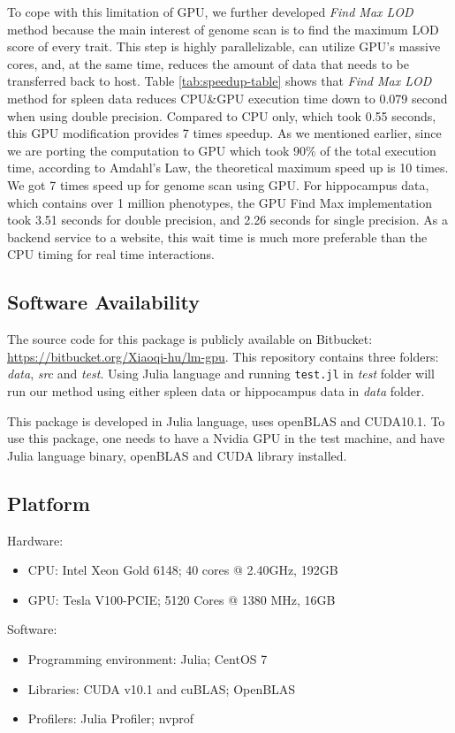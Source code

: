 \documentclass[9pt,twocolumn,twoside,lineno]{gsag3jnl}
\newcommand{\code}{\texttt}
\begin{document}
To cope with this limitation of GPU, we further developed \textit{Find Max LOD} method because the main interest of genome scan is to find the maximum LOD score of every trait. 
This step is highly parallelizable, can utilize GPU's massive cores, and, at the same time, reduces the amount of data that needs to be transferred back to host. 
Table \ref{tab:speedup-table} shows that \textit{Find Max LOD} method for spleen data reduces CPU\&GPU execution time down to 0.079 second when using double precision. 
Compared to CPU only, which took 0.55 seconds, this GPU modification provides 7 times speedup. 
As we mentioned earlier, since we are porting the computation to GPU which took 90\% of the total execution time, according to Amdahl's Law, the theoretical maximum speed up is 10 times. 
We got 7 times speed up for genome scan using GPU. 
For hippocampus data, which contains over 1 million phenotypes, the GPU Find Max implementation took 3.51 seconds for double precision, and 2.26 seconds for single precision. 
As a backend service to a website, this wait time is much more preferable than the CPU timing for real time interactions. 

\subsection{Software Availability}
The source code for this package is publicly available on Bitbucket: \url{https://bitbucket.org/Xiaoqi-hu/lm-gpu}.
This repository contains three folders: \textit{data}, \textit{src} and \textit{test}. 
Using Julia language and running \code{test.jl} in \textit{test} folder will run our method using either spleen data or hippocampus data in \textit{data} folder. 

This package is developed in Julia language, uses openBLAS and CUDA10.1. 
To use this package, one needs to have a Nvidia GPU in the test machine,
and have Julia language binary, openBLAS and CUDA library installed. 

\subsection{Platform}
Hardware:
 \begin{itemize}
	\item CPU: Intel Xeon Gold 6148; 40 cores @ 2.40GHz, 192GB 
	\item GPU: Tesla V100-PCIE; 5120 Cores @ 1380 MHz, 16GB
\end{itemize}
Software: 
\begin{itemize}
	\item Programming environment: Julia; CentOS 7
	\item Libraries: CUDA v10.1 and cuBLAS; OpenBLAS
	\item Profilers: Julia Profiler; nvprof
\end{itemize}
\end{document}
